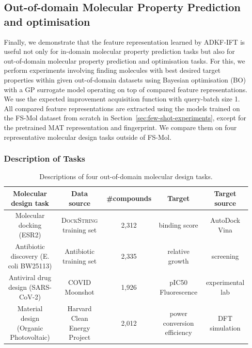     \subsection{Out-of-domain Molecular Property Prediction and optimisation}\label{sec:adkf:mol-opt}
        Finally, we demonstrate that the feature representation learned by ADKF-IFT is useful not only for
        in-domain molecular property prediction tasks but also for out-of-domain molecular property
        prediction and optimisation tasks. For this, we perform experiments involving finding molecules
        with best desired target properties within given out-of-domain datasets using
        Bayesian optimisation (BO) with a GP surrogate model operating on top of compared
        feature representations. We use the expected improvement acquisition function \citep{jones1998efficient}
        with query-batch size 1. All compared feature representations are extracted using the models
        trained on the FS-Mol dataset from scratch in Section~\ref{sec:few-shot-experiments},
        except for the pretrained MAT representation and fingerprint. We compare them
        on four representative molecular design tasks outside of FS-Mol.

        \subsubsection{Description of Tasks}

        \begin{table}[ht]
            \tiny
            \caption{Descriptions of four out-of-domain molecular design tasks.}
            \label{tab:optimisation tasks}
            \centering
            \begin{tabular}{ccccc}
                \toprule
                Molecular design task & Data source & \#compounds & Target & Target source \\
                \midrule
                Molecular docking (ESR2) & \textsc{DockString} training set & 2,312 & binding score & AutoDock Vina \\
                Antibiotic discovery (E. coli BW25113) & Antibiotic training set & 2,335 & relative growth & screening\\
                Antiviral drug design (SARS-CoV-2) & COVID Moonshot & 1,926 & pIC50 Fluorescence & experimental lab \\
                Material design (Organic Photovoltaic) & Harvard Clean Energy Project & 2,012 & power conversion efficiency & DFT simulation \\
                \bottomrule
            \end{tabular}
        \end{table}

